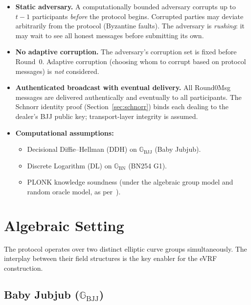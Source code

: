 \documentclass[11pt,a4paper]{article}
\newcommand{\G}{\mathbb{G}}
\newcommand{\Gbj}{\G_{\mathrm{BJJ}}}
\newcommand{\Gbn}{\G_{\mathrm{BN}}}
\begin{document}
\begin{itemize}[nosep]
  \item \textbf{Static adversary.} A computationally bounded adversary corrupts
    up to $t - 1$ participants \emph{before} the protocol begins. Corrupted
    parties may deviate arbitrarily from the protocol (Byzantine faults). The
    adversary is \emph{rushing}: it may wait to see all honest messages before
    submitting its own.

  \item \textbf{No adaptive corruption.} The adversary's corruption set is fixed
    before Round~0. Adaptive corruption (choosing whom to corrupt based on
    protocol messages) is \emph{not} considered.

  \item \textbf{Authenticated broadcast with eventual delivery.} All Round0Msg
    messages are delivered authentically and eventually to all participants. The
    Schnorr identity proof (Section~\ref{sec:schnorr}) binds each dealing to
    the dealer's BJJ public key; transport-layer integrity is assumed.

  \item \textbf{Computational assumptions:}
    \begin{itemize}[nosep]
      \item Decisional Diffie--Hellman (DDH) on $\Gbj$ (Baby Jubjub).
      \item Discrete Logarithm (DL) on $\Gbn$ (BN254 G1).
      \item PLONK knowledge soundness (under the algebraic group model and
        random oracle model, as per~\cite{gabizon2019}).
    \end{itemize}
\end{itemize}

\section{Algebraic Setting}
\label{sec:algebra}

The protocol operates over two distinct elliptic curve groups simultaneously.
The interplay between their field structures is the key enabler for the eVRF
construction.

\subsection{Baby Jubjub ($\Gbj$)}
\label{sec:bjj}
\end{document}
